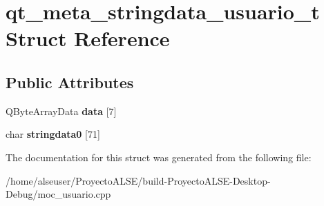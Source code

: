 \hypertarget{structqt__meta__stringdata__usuario__t}{}\section{qt\+\_\+meta\+\_\+stringdata\+\_\+usuario\+\_\+t Struct Reference}
\label{structqt__meta__stringdata__usuario__t}
\subsection*{Public Attributes}
\begin{DoxyCompactItemize}
\item 
\mbox{\label{structqt__meta__stringdata__usuario__t_a9ded756139989567fb35404113366e8b}} 
Q\+Byte\+Array\+Data {\bfseries data} \mbox{[}7\mbox{]}
\item 
\mbox{\label{structqt__meta__stringdata__usuario__t_a2d57b54de68058ddda500c7276aba52e}} 
char {\bfseries stringdata0} \mbox{[}71\mbox{]}
\end{DoxyCompactItemize}


The documentation for this struct was generated from the following file\+:\begin{DoxyCompactItemize}
\item 
/home/alseuser/\+Proyecto\+A\+L\+S\+E/build-\/\+Proyecto\+A\+L\+S\+E-\/\+Desktop-\/\+Debug/moc\+\_\+usuario.\+cpp\end{DoxyCompactItemize}
